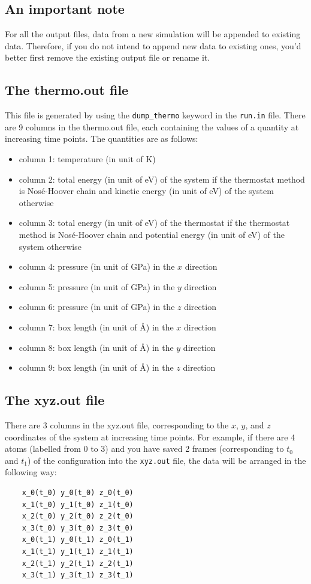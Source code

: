 \documentclass[12pt,a4paper]{report}
\begin{document}
\subsection{An important note}

For all the output files, data from a new simulation will be appended to existing data. Therefore, if you do not intend to append new data to existing ones, you'd better first remove the existing output file or rename it.

\subsection{The thermo.out file}

This file is generated by using the \verb"dump_thermo" keyword in the \verb"run.in" file.
There are 9 columns in the thermo.out file, each containing the values of a quantity at increasing time points. The quantities are as follows:
\begin{itemize}
\item column 1: temperature (in unit of K)
\item column 2: total energy (in unit of eV) of the system if the thermostat method is Nos\'{e}-Hoover chain and kinetic energy (in unit of eV) of the system otherwise
\item column 3: total energy (in unit of eV) of the thermostat if the thermostat method is Nos\'{e}-Hoover chain and potential energy (in unit of eV) of the system otherwise
\item column 4: pressure (in unit of GPa) in the $x$ direction
\item column 5: pressure (in unit of GPa) in the $y$ direction
\item column 6: pressure (in unit of GPa) in the $z$ direction
\item column 7: box length (in unit of \AA) in the $x$ direction
\item column 8: box length (in unit of \AA) in the $y$ direction
\item column 9: box length (in unit of \AA) in the $z$ direction
\end{itemize}


\subsection{The xyz.out file}

There are 3 columns in the xyz.out file, corresponding to the $x$, $y$, and $z$ coordinates of the system at increasing time points. For example, if there are 4 atoms (labelled from 0 to 3) and you have saved 2 frames (corresponding to $t_0$ and $t_1$) of the configuration into the \verb"xyz.out" file, the data will be arranged in the following way:
\begin{verbatim}
    x_0(t_0) y_0(t_0) z_0(t_0)
    x_1(t_0) y_1(t_0) z_1(t_0)
    x_2(t_0) y_2(t_0) z_2(t_0)
    x_3(t_0) y_3(t_0) z_3(t_0)
    x_0(t_1) y_0(t_1) z_0(t_1)
    x_1(t_1) y_1(t_1) z_1(t_1)
    x_2(t_1) y_2(t_1) z_2(t_1)
    x_3(t_1) y_3(t_1) z_3(t_1)
\end{verbatim}
\end{document}
